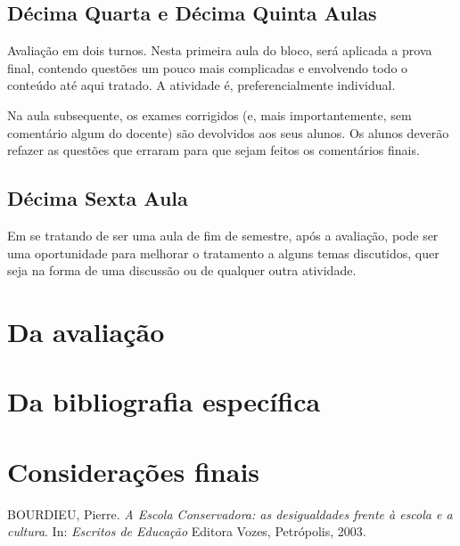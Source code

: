 \documentclass[12pt,a4paper]{article}
\begin{document}
	\subsection*{Décima Quarta e Décima Quinta Aulas}
	
	Avaliação em dois turnos. Nesta primeira aula do bloco, será aplicada 
	a prova final, contendo questões um pouco mais complicadas e 
	envolvendo todo o conteúdo até aqui tratado. A atividade é, 
	preferencialmente individual. 
	
	Na aula subsequente, os exames corrigidos (e, mais importantemente,  
	sem comentário algum do docente) são devolvidos aos seus alunos. Os 
	alunos deverão refazer as questões que erraram para que sejam 
    feitos os comentários finais. 
	
	\subsection*{Décima Sexta Aula}
	
	Em se tratando de ser uma aula de fim de semestre, após a avaliação, 
	pode ser uma oportunidade para melhorar o tratamento a alguns temas 
	discutidos, quer seja na forma de uma discussão ou de qualquer outra 
	atividade. 



	\newpage
	
	\section{Da avaliação}

	\section{Da bibliografia específica}

	\newpage

	\section{Considerações finais}

	
	\begin{thebibliography}{9}
		
		BOURDIEU, Pierre. 
		\textit{A Escola Conservadora: as desigualdades 
		frente à escola e a cultura}. 
		In: \textit{Escritos de Educação} 
		Editora Vozes, Petrópolis, 2003.
				

	\end{thebibliography}
	
	
	
\end{document}
